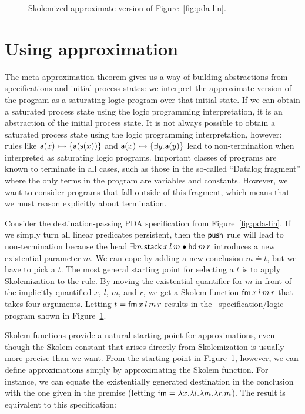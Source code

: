 \begin{figure}
\caption{Skolemized approximate version of Figure~\ref{fig:pda-lin}.}
\label{fig:pda-pers}
\end{figure}



\section{Using approximation}

The meta-approximation theorem gives us a way of building abstractions
from specifications and initial process states: we interpret the
approximate version of the program as a saturating logic program over
that initial state. If we can obtain a saturated process state using
the logic programming interpretation, it is an abstraction of the
initial process state. It is not always possible to obtain a saturated
process state using the logic programming interpretation, however:
rules like ${\sf a}(x) \rightarrowtail \{ {\sf a}({\sf s}(x)) \}$ and ${\sf
  a}(x) \rightarrowtail \{ \exists y. {\sf a}(y) \}$ lead to non-termination
when interpreted as saturating logic programs. Important classes 
of programs are known to terminate in all cases, such as those in the
so-called ``Datalog fragment'' where the only terms in the program
are variables and constants. However, we want to consider programs
that fall outside of this fragment, which means that we must 
reason explicitly about termination.

Consider the destination-passing PDA specification from
Figure~\ref{fig:pda-lin}. If we simply turn all linear predicates
persistent, then the ${\sf push}$ rule will lead to non-termination
because the head $\exists m. {\sf stack}\,x\,l\,m \mathbin{\bullet} {\sf
  hd}\,m\,r$ introduces a new existential parameter $m$. We can cope
by adding a new conclusion $m \doteq t$, but we have to pick a $t$.
The most general starting point for selecting a $t$ is to apply
Skolemization to the rule. By moving the existential quantifier for
$m$ in front of the implicitly quantified $x$, $l$, $m$, and $r$, we
get a Skolem function ${\sf fm}\,x\,l\,m\,r$ that takes four
arguments. Letting $t = {\sf fm}\,x\,l\,m\,r$ results in the
\sls~specification/logic program shown in
Figure~\ref{fig:pda-pers}.

Skolem functions provide a natural starting point for approximations,
even though the Skolem constant that arises directly from
Skolemization is usually more precise than we want. From the starting
point in Figure~\ref{fig:pda-pers}, however, we can define
approximations simply by approximating the Skolem function.  For
instance, we can equate the existentially generated destination in the
conclusion with the one given in the premise (letting ${\sf fm} =
\lambda x. \lambda l. \lambda m. \lambda r. m$). The result is
equivalent to this specification:

